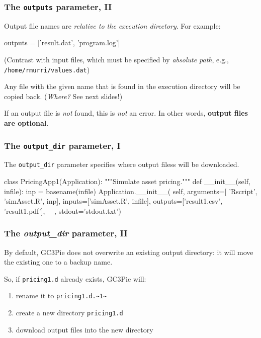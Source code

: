 \documentclass[english,serif,mathserif,xcolor=pdftex,dvipsnames,table]{beamer}
\begin{document}
\begin{frame}[fragile]
  \frametitle{The \texttt{outputs} parameter, II}

  Output file names are \emph{relative to the execution directory}.
  For example:
  \begin{python}
    outputs = ['result.dat', 'program.log']
  \end{python}

  \+
  (Contrast with input files, which must be specified by
  \emph{absolute path}, e.g., \texttt{/home/rmurri/values.dat})

  \+
  Any file with the given name that is found in the execution
  directory will be copied back. (\emph{Where?} See next slides!)

  \+
  If an output file is \emph{not} found, this is \emph{not} an
  error. In other words, \textbf{output files are optional}.
\end{frame}


\begin{frame}[fragile]
\frametitle{The \texttt{output\_dir} parameter, I}

The \lstinline|output_dir| parameter specifies where output filess
will be downloaded.

\+
\begin{python}
class PricingApp1(Application):
  """Simulate asset pricing."""
  def __init__(self, infile):
    inp = basename(infile)
    Application.__init__(
      self,
      arguments=[
        'Rscript', 'simAsset.R', inp],
      inputs=['simAsset.R', infile],
      outputs=['result1.csv', 'result1.pdf'],
      ~~,
      stdout='stdout.txt')
\end{python}
\end{frame}


\begin{frame}[fragile]
  \frametitle{The \emph{output\_dir} parameter, II}

  By default, GC3Pie does not overwrite an existing output directory:
  it will move the existing one to a backup name.

  \+
  So, if \texttt{pricing1.d} already exists, GC3Pie will:
  \begin{enumerate}
  \item rename it to \lstinline|pricing1.d.~1~|
  \item create a new directory \texttt{pricing1.d}
  \item download output files into the new directory
  \end{enumerate}
\end{frame}
\end{document}
